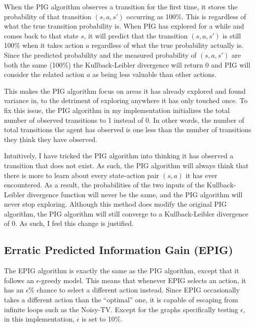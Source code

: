 \documentclass[12pt]{thesis}
\begin{document}
When the PIG algorithm observes a transition for the first time, it stores the probability of that transition $(s,a,s')$ occurring as 100\%. This is regardless of what the true transition probability is. When PIG has explored for a while and comes back to that state $s$, it will predict that the transition $(s,a,s')$ is still 100\% when it takes action $a$ regardless of what the true probability actually is. Since the predicted probability and the measured probability of $(s,a,s')$ are both the same (100\%) the Kullback-Leibler divergence will return 0 and PIG will consider the related action $a$ as being less valuable than other actions.

This makes the PIG algorithm focus on areas it has already explored and found variance in, to the detriment of exploring anywhere it has only touched once. To fix this issue, the PIG algorithm in my implementation initializes the total number of observed transitions to 1 instead of 0. In other words, the number of total transitions the agent has observed is one less than the number of transitions they \b{think} they have observed.

Intuitively, I have tricked the PIG algorithm into thinking it has observed a transition that does not exist. As such, the PIG algorithm will always think that there is more to learn about every state-action pair $(s,a)$ it has ever encountered. As a result, the probabilities of the two inputs of the Kullback-Leibler divergence function will never be the same, and the PIG algorithm will never stop exploring. Although this method does modify the original PIG algorithm, the PIG algorithm will still converge to a Kullback-Leibler divergence of 0. As such, I feel this change is justified.

\subsection{Erratic Predicted Information Gain (EPIG)}
The EPIG algorithm is exactly the same as the PIG algorithm, except that it follows an $\epsilon$-greedy model. This means that whenever EPIG selects an action, it has an $\epsilon$\% chance to select a different action instead. Since EPIG occasionally takes a different action than the ``optimal'' one, it is capable of escaping from infinite loops such as the Noisy-TV. Except for the graphs specifically testing $\epsilon$, in this implementation, $\epsilon$ is set to 10\%.
\end{document}
